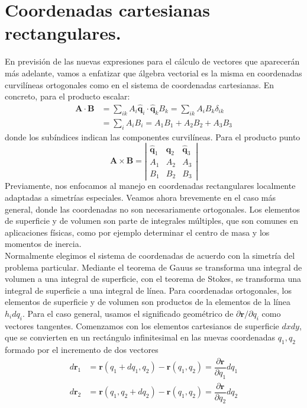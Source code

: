 \section{Coordenadas cartesianas rectangulares.}
En previsión de las nuevas expresiones para el cálculo de vectores que aparecerán más adelante, vamos a enfatizar que álgebra vectorial es la misma en coordenadas curvilíneas ortogonales como en el sistema de coordenadas cartesianas. En concreto, para el producto escalar:
\[ \begin{split}
\mathbf{A} \cdot \mathbf{B} &=  \sum_{ik} A_{i} \mathbf{\widehat{q}}_{i} \cdot \mathbf{\widehat{q}}_{k} B_{k} = \sum_{ik} A_{i} B_{k} \delta_{ik} \\
&= \sum_{i} A_{i}B_{i} = A_{1}B_{1} + A_{2} B_{2} + A_{3} B_{3}
\end{split} \]
donde los subíndices indican las componentes curvilíneas. Para el producto punto
\[ \mathbf{A} \times \mathbf{B} = \left| \begin{matrix}
\mathbf{\widehat{q}}_{1} & \mathbf{\widehat{q}}_{2} & \mathbf{\widehat{q}}_{3} \\
A_{1} & A_{2} & A_{3} \\
B_{1} & B_{2} & B_{3}
\end{matrix} \right| \]
Previamente, nos enfocamos al manejo en coordenadas rectangulares localmente adaptadas a simetrías especiales. Veamos ahora brevemente en el caso más general, donde las coordenadas no son necesariamente ortogonales. Los elementos de superficie y de volumen son parte de integrales múltiples, que son comunes en aplicaciones físicas, como por ejemplo determinar el centro de masa y los momentos de inercia.
\\
Normalmente elegimos el sistema de coordenadas de acuerdo con la simetría del problema particular. Mediante el teorema de Gauus se transforma una integral de volumen a una integral de superficie, con el teorema de Stokes, se transforma una integral de superficie a una integral de línea. Para coordenadas ortogonales, los elementos de superficie y de volumen son productos de la elementos de la línea $h_{i}dq_{i}$. Para el caso general, usamos el significado geométrico de $\partial \mathbf{r} / \partial q_{i}$ como vectores tangentes. Comenzamos con los elementos cartesianos de superficie $dxdy$, que se convierten en un rectángulo infinitesimal en las nuevas coordenadas $q_{1}, q_{2}$ formado por el incremento de dos vectores
\[ \begin{split}
d \mathbf{r}_{1} &= \mathbf{r}(q_{1} + dq_{1},q_{2}) - \mathbf{r}(q_{1}, q_{2}) = \dfrac{\partial \mathbf{r}}{\partial q_{1}} dq_{1} \\
d \mathbf{r}_{2} &= \mathbf{r}(q_{1}, q_{2}+ dq_{2}) - \mathbf{r}(q_{1}, q_{2}) = \dfrac{\partial \mathbf{r}}{\partial q_{2}} dq_{2}
\end{split} \]
